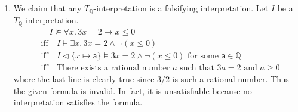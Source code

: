 \begin{exer}[3.3]
    $ $
    \begin{enumerate}[label=(\alph*)]
        \item
            We claim that any $T_{\mathbb{Q}}$-interpretation is a falsifying interpretation.
            Let $I$ be a $T_{\mathbb{Q}}$-interpretation.
            \begin{align*}
                & \quad I \not\models \forall x.\, 3x = 2 \rightarrow x \leq 0 \\
                & \text{iff}\quad I \models \exists x.\, 3x = 2 \land \neg(x \leq 0) \\
                & \text{iff}\quad I \vartriangleleft \{ x \mapsto \textsf{a} \} \models 3x = 2 \land \neg(x \leq 0) \text{ for some $\textsf{a} \in \mathbb{Q}$}\\
                & \text{iff}\quad \text{There exists a rational number $a$ such that $3a = 2$ and $a \geq 0$}
            \end{align*}
            where the last line is clearly true since $3 / 2$ is such a rational number.
            Thus the given formula is invalid.
            In fact, it is unsatisfiable because no interpretation satisfies the formula.
    \end{enumerate}
\end{exer}

